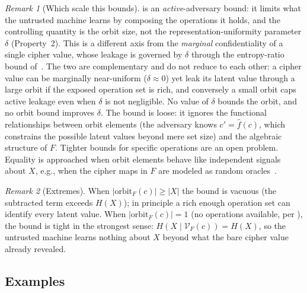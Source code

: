 \documentclass[11pt]{article}
\theoremstyle{definition}
\theoremstyle{plain}
\theoremstyle{remark}
\newtheorem{remark}{Remark}[section]
\newcommand{\fhat}{\hat{f}}
\newcommand{\orbitF}{\mathrm{orbit}_F}
\begin{document}
\begin{remark}[Which scale this bounds]
\label{rem:two-scales}
 is an \emph{active}-adversary bound:
it limits what the untrusted machine learns by composing the
operations it holds, and the controlling quantity is the orbit size,
not the representation-uniformity parameter $\delta$ (Property~2).
This is a different axis from the \emph{marginal} confidentiality of a
single cipher value, whose leakage is governed by $\delta$ through the
entropy-ratio bound of~\cite{towell2026cipher,towell2026maxconf}.
The two are complementary and do not reduce to each other: a cipher
value can be marginally near-uniform ($\delta \approx 0$) yet leak its
latent value through a large orbit if the exposed operation set is
rich, and conversely a small orbit caps active leakage even when
$\delta$ is not negligible.
No value of $\delta$ bounds the orbit, and no orbit bound improves
$\delta$.
The bound is loose: it ignores the functional relationships between
orbit elements (the adversary knows $c' = \fhat(c)$, which constrains
the possible latent values beyond mere set size) and the algebraic
structure of $F$.
Tighter bounds for specific operations are an open problem.
Equality is approached when orbit elements behave like independent
signals about $X$, e.g., when the cipher maps in $F$ are modeled as
random oracles~\cite{bellare1993random}.
\end{remark}

\begin{remark}[Extremes]
When $|\orbitF(c)| \geq |X|$ the bound is vacuous (the subtracted term
exceeds $H(X)$); in principle a rich enough operation set can identify
every latent value.
When $|\orbitF(c)| = 1$ (no operations available, per
), the bound is tight in the strongest sense:
$H(X \mid \mathcal{V}_F(c)) = H(X)$, so the untrusted machine learns
nothing about $X$ beyond what the bare cipher value already revealed.
\end{remark}


\subsection{Examples}
\label{sec:orbit-examples}
\end{document}
